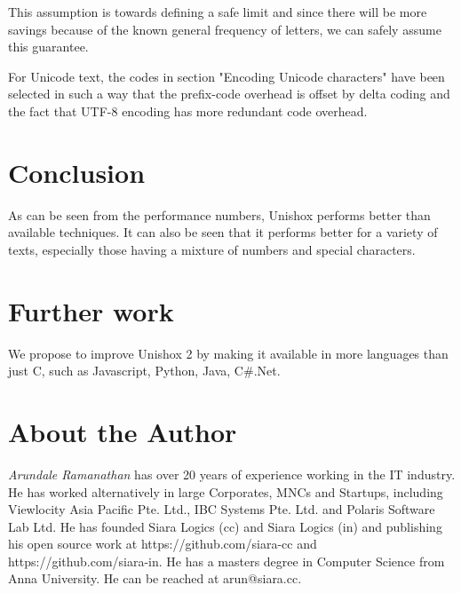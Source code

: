 \documentclass[]{article}
\begin{document}
This assumption is towards defining a safe limit and since there will be more savings because of the known general frequency of letters, we can safely assume this guarantee.

For Unicode text, the codes in section "Encoding Unicode characters" have been selected in such a way that the prefix-code overhead is offset by delta coding and the fact that UTF-8 encoding has more redundant code overhead.

\section{Conclusion}

As can be seen from the performance numbers, Unishox performs better than available techniques.  It can also be seen that it performs better for a variety of texts, especially those having a mixture of numbers and special characters.

\section{Further work}

We propose to improve Unishox 2 by making it available in more languages than just C, such as Javascript, Python, Java, C\#.Net.

\section{About the Author}

\emph{Arundale Ramanathan} has over 20 years of experience working in the IT industry.  He has worked alternatively in large Corporates, MNCs and Startups, including Viewlocity Asia Pacific Pte. Ltd., IBC Systems Pte. Ltd. and Polaris Software Lab Ltd. He has founded Siara Logics (cc) and Siara Logics (in) and publishing his open source work at https://github.com/siara-cc and https://github.com/siara-in. He has a masters degree in Computer Science from Anna University.  He can be reached at arun@siara.cc.
\end{document}
